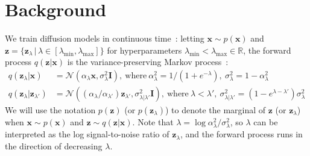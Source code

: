 \documentclass{article} %
\newcommand{\bI}{\mathbf{I}}
\newcommand{\bx}{\mathbf{x}}
\newcommand{\bz}{\mathbf{z}}
\begin{document}
\section{Background}
\label{sec:background}
We train diffusion models in continuous time~\citep{song2020score,chen2020wavegrad,kingma2021variational}: letting $\bx \sim p(\bx)$ and $\bz = \{\bz_\lambda \,|\, \lambda \in [\lambda_{\mathrm{min}}, \lambda_{\mathrm{max}}]\}$ for hyperparameters $\lambda_{\mathrm{min}} < \lambda_{\mathrm{max}} \in \mathbb{R}$, the forward process $q(\bz|\bx)$ is the variance-preserving Markov process~\citep{sohl2015deep}:
\begin{align}
q(\bz_\lambda|\bx) &= \mathcal{N}(\alpha_\lambda \bx, \sigma_\lambda^2 \bI), \ \text{where}\ \alpha_\lambda^2 = 1/(1+e^{-\lambda}),\ \sigma_\lambda^2 = 1-\alpha_\lambda^2 \\
q(\bz_{\lambda} | \bz_{\lambda'}) &= \mathcal{N}((\alpha_{\lambda}/\alpha_{\lambda'})\bz_{\lambda'}, \sigma_{\lambda|\lambda'}^2\bI), \ \text{where}\ \lambda < \lambda',\ 
\sigma^2_{\lambda|\lambda'} = (1-e^{\lambda-\lambda'})\sigma_\lambda^2 %
\end{align}
We will use the notation $p(\bz)$ (or $p(\bz_\lambda)$) to denote the marginal of $\bz$ (or $\bz_\lambda$) when $\bx \sim p(\bx)$ and $\bz \sim q(\bz|\bx)$. Note that $\lambda = \log \alpha_\lambda^2/\sigma_\lambda^2$, so $\lambda$ can be interpreted as the log signal-to-noise ratio of $\bz_\lambda$, and the forward process runs in the direction of decreasing $\lambda$.
\end{document}
